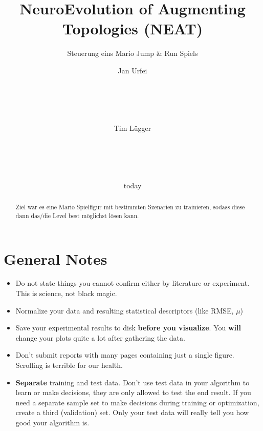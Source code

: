 \documentclass{hbrs-ecta-report}
\begin{document}

\title{NeuroEvolution of Augmenting Topologies (NEAT)}
\subtitle{Steuerung eins Mario Jump \& Run Spiels}

\author{
Jan Urfei\\
       \\
       \\
       \\
       \\
\and
	Tim Lügger\\
	\\
	\\
	\\
	\\
}
\date{today}
\maketitle
\begin{abstract}
Ziel war es eine Mario Spielfigur mit bestimmten Szenarien zu trainieren, sodass diese dann das/die Level best möglichst lösen kann.
\end{abstract}

\section{General Notes}
\label{sec:generalnotes}
\begin{itemize}
\item Do not state things you cannot confirm either by literature or experiment. This is science, not black magic.
\item Normalize your data and resulting statistical descriptors (like RMSE, $\mu$)
\item Save your experimental results to disk \textbf{before you visualize}. You \textbf{will} change your plots quite a lot after gathering the data.
\item Don't submit reports with many pages containing just a single figure. Scrolling is terrible for our health.
\item \textbf{Separate} training and test data. Don't use test data in your algorithm to learn or make decisions, they are only allowed to test the end result. If you need a separate sample set to make decisions during training or optimization, create a third (validation) set. Only your test data will really tell you how good your algorithm is. 
\end{itemize}
\end{document}
